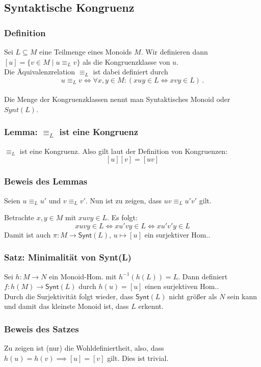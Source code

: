 \documentclass[12pt, german]{article}
\newcommand{\inv}{^{-1}}
\newcommand{\synt}{\mathsf{Synt}}
\begin{document}
	\subsection{Syntaktische Kongruenz}
	\subsubsection{Definition}
	Sei $L \subseteq M$ eine Teilmenge eines Monoids $M$. Wir definieren dann $[u] = \{v \in M \mid u \equiv_L v\}$ als die Kongruenzklasse von $u$.\\
	Die Äquivalenzrelation $\equiv_L$ ist dabei definiert durch $$ u \equiv_L v \iff \forall x,y \in M : (xuy \in L \iff xvy \in L)\, .$$
	\\
	Die Menge der Kongruenzklassen nennt man Syntaktisches Monoid oder $Synt(L)$.
	
	\subsubsection{Lemma: $\equiv_L$ ist eine Kongruenz}
	$\equiv_L$ ist eine Kongruenz. Also gilt laut der Definition von Kongruenzen: $$[u][v]=[uv]$$ 
	
	\subsubsection{Beweis des Lemmas}
	Seien $u \equiv_L u'$ und $v \equiv_L v'$. Nun ist zu zeigen, dass $uv \equiv_L u'v'$ gilt. 
	
	Betrachte $x,y \in M$ mit $xuvy \in L$. 
	Es folgt: $$xuvy \in L \iff xu'vy \in L \iff xu'v'y \in L$$ Damit ist auch $\pi: M \to \synt(L), \, u \mapsto [u]$ ein surjektiver Hom.. 
	
	\subsubsection{Satz: Minimalität von Synt(L)}
	Sei $h: M \to N$ ein Monoid-Hom. mit $h\inv(h(L)) = L$. Dann definiert $f:h(M) \to \synt(L)$ durch $h(u) = [u]$ einen surjektiven Hom.. \\
	Durch die Surjektivität folgt wieder, dass $\synt(L)$ nicht größer als $N$ sein kann und damit das kleinste Monoid ist, dass $L$ erkennt. 
	
	\subsubsection{Beweis des Satzes}	 
	Zu zeigen ist (nur) die Wohldefiniertheit, also, dass $h(u) = h(v) \implies [u]=[v]$ gilt. Dies ist trivial.
	
\end{document}
